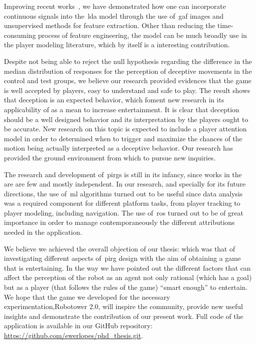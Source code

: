Improving recent works~\citep{smith_mining_2016}, we have demonstrated how one can incorporate continuous signals into the~\gls{lda} model through the use of~\gls{gaf} images and unsupervised methods for feature extraction. Other than reducing the time-consuming process of feature engineering, the model can be much broadly use in the player modeling literature, which by itself is a interesting contribution. 

Despite not being able to reject the null hypothesis regarding the difference in the median distribution of responses for the perception of deceptive movements in the control and test groups, we believe our research provided evidences that the game is well accepted by players, easy to understand and safe to play. The result shows that deception is an expected behavior, which foment new research in its applicability of as a mean to increase entertainment. It is clear that deception should be a well designed behavior and its interpretation by the players ought to be accurate. New research on this topic is expected to include a player attention model in order to determined when to trigger and maximize the chances of the motion being actually interpreted as a deceptive behavior. Our research has provided the ground environment from which to pursue new inquiries.

The research and development of~\gls{pirg}s is still in its infancy, since works in the are are few and mostly independent. In our research, and specially for its future directions, the use of~\gls{ml} algorithms turned out to be useful since data analysis was a required component for different platform tasks, from player tracking to player modeling, including navigation. The use of~\gls{ros} turned out to be of great importance in order to manage contemporaneously the different attributions needed in the application.

We believe we achieved the overall objection of our thesis: which was that of investigating different aspects of~\gls{pirg} design with the aim of obtaining a game that is entertaining. In the way we have pointed out the different factors that can affect the perception of the robot as an agent not only rational (which has a goal) but as a player (that follows the rules of the game) ``smart enough'' to entertain. We hope that the game we developed for the necessary experimentation,\ie Robotower 2.0, will inspire the community, provide new useful insights and demonstrate the contribution of our present work. Full code of the application is available in our GitHub repository: \url{https://github.com/ewerlopes/phd_thesis.git}.

